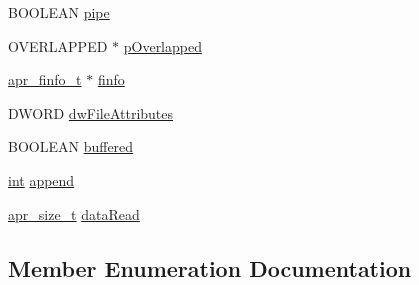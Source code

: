 \begin{DoxyCompactItemize}
B\+O\+O\+L\+E\+AN \hyperlink{structapr__file__t_a98787926798793cca903d1bb67e205f1}{pipe}
\item 
O\+V\+E\+R\+L\+A\+P\+P\+ED $\ast$ \hyperlink{structapr__file__t_aa3f5d813a84becd92654f1a1103a6f21}{p\+Overlapped}
\item 
\hyperlink{structapr__finfo__t}{apr\+\_\+finfo\+\_\+t} $\ast$ \hyperlink{structapr__file__t_aaec5d809637e54c8e354e14722667985}{finfo}
\item 
D\+W\+O\+RD \hyperlink{structapr__file__t_aba71107ac118a981e7e46c5aece95f14}{dw\+File\+Attributes}
\item 
B\+O\+O\+L\+E\+AN \hyperlink{structapr__file__t_ab36fae9b92d5fd177739dc191cc2ed9f}{buffered}
\item 
\hyperlink{pcre_8txt_a42dfa4ff673c82d8efe7144098fbc198}{int} \hyperlink{structapr__file__t_ae23bb1a5356b4a32865ff018f61d3d76}{append}
\item 
\hyperlink{group__apr__platform_gaaa72b2253f6f3032cefea5712a27540e}{apr\+\_\+size\+\_\+t} \hyperlink{structapr__file__t_a0681bd1bac0c8dc92ad36203cedc563b}{data\+Read}
\end{DoxyCompactItemize}


\subsection{Member Enumeration Documentation}
